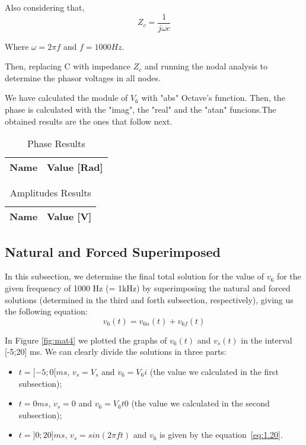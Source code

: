Also considering that,
\begin{equation}
     Z_c = \frac{1}{j\omega c}
\end{equation}\par
Where $\omega= 2\pi f$ and $f= 1000Hz$.\par

Then, replacing C with  impedance $Z_c$ and running the nodal analysis to determine the phasor voltages in all nodes.\par


We have calculated the module of $V_6$ with "abs" Octave's function. Then, the phase is calculated with the "imag", the "real" and the "atan" funcions.The obtained results are the ones that follow next. \par

\begin{table}[H]
  \centering
  \begin{tabular}{|l|r|}
    \hline    
    {\bf Name} & {\bf Value [Rad]} \\ \hline
    
  \end{tabular}
  \caption{Phase Results}
  \label{tab:mat4}
\end{table}

\begin{table}[H]
  \centering
  \begin{tabular}{|l|r|}
    \hline    
    {\bf Name} & {\bf Value [V]} \\ \hline
    
  \end{tabular}
  \caption{Amplitudes Results}
  \label{tab:mat4a}
\end{table}

\subsection{Natural and Forced Superimposed}
In this subsection, we determine the final total solution for the value of $v_6$ for the given frequency of 1000 Hz (= 1kHz) by superimposing the natural and forced solutions (determined in the third and forth subsection, respectively), giving us the following equation:
\begin{equation}
v_6(t) = v_{6n}(t) + v_{6f}(t)
\label{eq:1.20}
\end{equation}

In Figure \ref{fig:mat4} we plotted the graphs of $v_6(t)$ and $v_s(t)$ in the interval [-5;20] ms. We can clearly divide the solutions in three parts:
\begin{itemize}
\item $t=[-5;0[ ms$, $v_s = V_s$ and $v_6 = V_6i$ (the value we calculated in the first subsection);
\item $t=0 ms$, $v_s = 0$ and $v_6 = V_6t0$ (the value we calculated in the second subsection);
\item $t=]0;20] ms$, $v_s = sin(2\pi f t)$ and $v_6$ is given by the equation~\ref{eq:1.20}.
\end{itemize}

